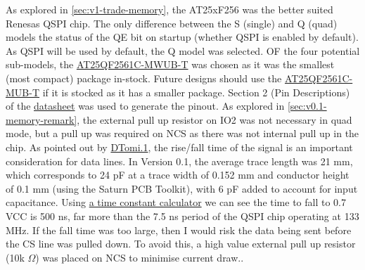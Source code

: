 As explored in \autoref{sec:v1-trade-memory}, the AT25xF256 was the better suited Renesas QSPI chip. The only difference between the S (single) and Q (quad) models the status of the QE bit on startup (whether QSPI is enabled by default). As QSPI will be used by default, the Q model was selected. OF the four potential sub-models, the \href{https://au.mouser.com/ProductDetail/Renesas-Dialog/AT25QF2561C-MWUB-T?qs=olJun0bQHM%2FqfVfqXrnLBg%3D%3D}{AT25QF2561C-MWUB-T} was chosen as it was the smallest (most compact) package in-stock. Future designs should use the \href{https://au.mouser.com/ProductDetail/Renesas-Dialog/AT25QF2561C-MUB-T?qs=olJun0bQHM%2Fuu3grdD8Csw%3D%3D}{AT25QF2561C-MUB-T} if it is stocked as it has a smaller package.
\nl
Section 2 (Pin Descriptions) of the \href{https://www.renesas.com/en/document/dst/at25sf2561cat25qf2561c-datasheet?r=25559126}{datasheet} was used to generate the pinout. As explored in \autoref{sec:v0.1-memory-remark}, the external pull up resistor on IO2 was not necessary in quad mode, but a pull up was required on NCS as there was not internal pull up in the chip.
\nl
As pointed out by \href{https://community.st.com/t5/stm32-mcus-products/is-internal-pull-up-the-same-as-external-pull-up-resistor/td-p/70477}{DTomi.1}, the rise/fall time of the signal is an important consideration for data lines. In Version 0.1, the average trace length was 21 mm, which corresponds to 24 pF at a trace width of 0.152 mm and conductor height of 0.1 mm (using the Saturn PCB Toolkit), with 6 pF added to account for input capacitance. Using \href{https://www.digikey.com/en/resources/conversion-calculators/conversion-calculator-time-constant}{a time constant calculator} we can see the time to fall to 0.7 VCC is 500 ns, far more than the 7.5 ns period of the QSPI chip operating at 133 MHz. If the fall time was too large, then I would risk the data being sent before the CS line was pulled down. To avoid this, a high value external pull up resistor (10k $\Omega$) was placed on NCS to minimise current draw..
\nl
